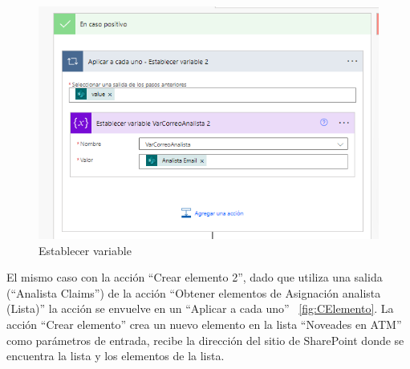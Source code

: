 \begin{figure}[H]
	\centering
	\includegraphics[scale=0.5]{Capitulo3/imagenes/flujo4.png}
	\caption{Establecer variable}
	\label{fig:Evar}
\end{figure}

El mismo caso con la acción ``Crear elemento 2'', dado que utiliza una salida (``Analista Claims'') de la acción ``Obtener elementos de Asignación analista (Lista)'' la acción se envuelve en un ``Aplicar a cada uno'' ~\ref{fig:CElemento}. La acción ``Crear elemento'' crea un nuevo elemento en la lista ``Noveades en ATM'' como parámetros de entrada, recibe la dirección del sitio de SharePoint donde se encuentra la lista y los elementos de la lista.

